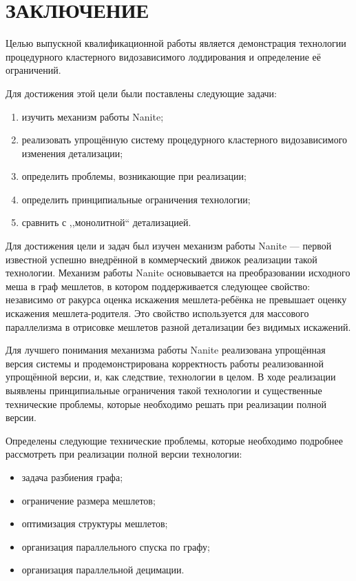 \clearpage
\section{ЗАКЛЮЧЕНИЕ}
Целью выпускной квалификационной работы является демонстрация технологии процедурного кластерного видозависимого лоддирования и определение её ограничений.

Для достижения этой цели были поставлены следующие задачи:
\begin{enumerate}
    \item изучить механизм работы Nanite;
    \item реализовать упрощённую систему процедурного кластерного видозависимого изменения детализации;
    \item определить проблемы, возникающие при реализации;
    \item определить принципиальные ограничения технологии;
    \item сравнить с ,,монолитной`` детализацией.
\end{enumerate}

Для достижения цели и задач был изучен механизм работы Nanite --- первой известной успешно внедрённой в коммерческий движок реализации такой технологии.
Механизм работы Nanite основывается на преобразовании исходного меша в граф мешлетов, в котором поддерживается следующее свойство: независимо от ракурса оценка искажения мешлета-ребёнка не превышает оценку искажения мешлета-родителя.
Это свойство используется для массового параллелизма в отрисовке мешлетов разной детализации без видимых искажений.

Для лучшего понимания механизма работы Nanite реализована упрощённая версия системы и продемонстрирована корректность работы реализованной упрощённой версии, и, как следствие, технологии в целом.
В ходе реализации выявлены принципиальные ограничения такой технологии и существенные технические проблемы, которые необходимо решать при реализации полной версии.

Определены следующие технические проблемы, которые необходимо подробнее рассмотреть при реализации полной версии технологии:
\begin{itemize}
    \item задача разбиения графа;
    \item ограничение размера мешлетов;
    \item оптимизация структуры мешлетов;
    \item организация параллельного спуска по графу;
    \item организация параллельной децимации.
\end{itemize}

